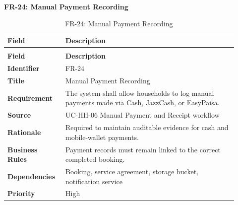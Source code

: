 \documentclass[12pt,a4paper]{article}
\begin{document}
\noindent\textbf{FR-24: Manual Payment Recording}\par
\vspace{4pt}
\begingroup\small\setlength{\tabcolsep}{4pt}\renewcommand{\arraystretch}{1.15}
\begin{longtable}{|>{\raggedright\arraybackslash}p{0.22\linewidth}|>{\raggedright\arraybackslash}p{0.70\linewidth}|}
\caption{FR-24: Manual Payment Recording}\label{tab:fr-24}\\
\hline
\textbf{Field} & \textbf{Description} \\ \hline
\endfirsthead
\multicolumn{2}{c}{Table \thetable\ Manual Payment Recording (continued)}\\
\hline
\textbf{Field} & \textbf{Description} \\ \hline
\endhead
\textbf{Identifier} & FR-24 \\ \hline
\textbf{Title} & Manual Payment Recording \\ \hline
\textbf{Requirement} & The system shall allow households to log manual payments made via Cash, JazzCash, or EasyPaisa. \\ \hline
\textbf{Source} & UC-HH-06 Manual Payment and Receipt workflow \\ \hline
\textbf{Rationale} & Required to maintain auditable evidence for cash and mobile-wallet payments. \\ \hline
\textbf{Business Rules} & Payment records must remain linked to the correct completed booking. \\ \hline
\textbf{Dependencies} & Booking, service agreement, storage bucket, notification service \\ \hline
\textbf{Priority} & High \\ \hline
\end{longtable}
\endgroup
\clearpage
\end{document}
